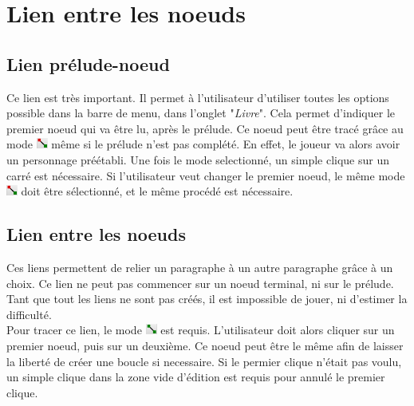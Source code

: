 \chapter{Lien entre les noeuds}\label{chapter:lien}
\label{sec:prerequis}

	\section{Lien prélude-noeud}
		Ce lien est très important. Il permet à l'utilisateur d'utiliser toutes les options possible dans la barre de menu, dans l'onglet "\textit{Livre}". Cela permet d'indiquer le premier noeud qui va être lu, après le prélude. Ce noeud peut être tracé grâce au mode \includegraphics[height=10pt]{img/modePreludeNoeud.png} même si le prélude n'est pas complété. En effet, le joueur va alors avoir un personnage préétabli.
		Une fois le mode selectionné, un simple clique sur un carré est nécessaire. Si l'utilisateur veut changer le premier noeud, le même mode \includegraphics[height=10pt]{img/modePreludeNoeud.png} doit être sélectionné, et le même procédé est nécessaire.

	\section{Lien entre les noeuds}
		Ces liens permettent de relier un paragraphe à un autre paragraphe grâce à un choix. Ce lien ne peut pas commencer sur un noeud terminal, ni sur le prélude. Tant que tout les liens ne sont pas créés, il est impossible de jouer, ni d'estimer la difficulté.\\

		Pour tracer ce lien, le mode \includegraphics[height=10pt]{img/modeLien.png} est requis. L'utilisateur doit alors cliquer sur un premier noeud, puis sur un deuxième. Ce noeud peut être le même afin de laisser la liberté de créer une boucle si necessaire.
		Si le permier clique n'était pas voulu, un simple clique dans la zone vide d'édition est requis pour annulé le premier clique.\\

